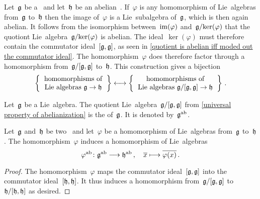 \begin{example}
  \label{universal property of abelianization}
  Let~$\mathfrak{g}$ be a~\liealgebra{$\kf$} and let~$\mathfrak{h}$ be an abelian~\liealgebra{$\kf$}.
  If~$\varphi$ is any homomorphism of Lie~algebras from~$\mathfrak{g}$ to~$\mathfrak{h}$ then the image of~$\varphi$ is a Lie~subalgebra of~$\mathfrak{g}$, which is then again abelian.
  It follows from the isomorphism between~$\operatorname{im}(\varphi)$ and~$\mathfrak{g} / {\ker(\varphi)}$ that the quotiont Lie~algebra~$\mathfrak{g} / {\ker(\varphi)}$ is abelian.
  The ideal~$\ker(\varphi)$ must therefore contain the commutator ideal~$[\mathfrak{g}, \mathfrak{g}]$, as seen in \cref{quotient is abelian iff moded out the commutator ideal}.
  The homomorphism~$\varphi$ does therefore factor through a homomorphism from~$\mathfrak{g} / [\mathfrak{g}, \mathfrak{g}]$ to~$\mathfrak{h}$.
  This construction gives a bijection
  \[
    \left\{
      \begin{tabular}{c}
        homomorphisms of \\
        Lie~algebras~$\glie \to \hlie$
      \end{tabular}
    \right\}
    \onetoone
    \left\{
      \begin{tabular}{c}
        homomorphisms of \\
        Lie~algebras $\glie/[\glie, \glie] \to \hlie$
      \end{tabular}
    \right\} \,.
  \]
\end{example}


\begin{definition}
  Let~$\mathfrak{g}$ be a Lie~algebra.
  The quotient Lie~algebra~$\mathfrak{g} / [\mathfrak{g}, \mathfrak{g}]$ from \cref{universal property of abelianization} is the  of~$\mathfrak{g}$.
  It is denoted by~$\mathfrak{g}^{\mathrm{ab}}$.
\end{definition}


\begin{proposition}
  \label{functoriality of abelianization}
  Let~$\mathfrak{g}$ and~$\mathfrak{h}$ be two~\liealgebras{$\kf$} and let~$\varphi$ be a homomorphism of Lie~algebras from~$\mathfrak{g}$ to~$\mathfrak{h}$.
  The homomorphism~$\varphi$ induces a homomorphism of Lie~algebras
  \[
    \varphi^{\ab}
    \colon
    \glie^{\ab}
    \to
    \hlie^{\ab} \,,
    \quad
    \class{x}
    \mapsto
    \class{\varphi(x)} \,.
  \]
\end{proposition}


\begin{proof}
  The homomorphism~$\varphi$ maps the commutator ideal~$[\mathfrak{g}, \mathfrak{g}]$ into the commutator ideal~$[\mathfrak{h}, \mathfrak{h}]$.
  It thus induces a homomorphism from~$\mathfrak{g} / [\mathfrak{g}, \mathfrak{g}]$ to~$\mathfrak{h} / [\mathfrak{h}, \mathfrak{h}]$ as desired.
\end{proof}


